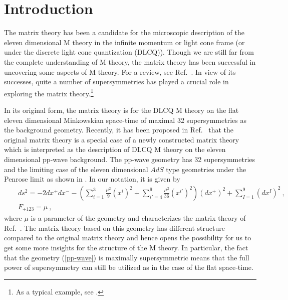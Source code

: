 \documentclass[a4paper,12pt]{article}
\begin{document}

\section{Introduction}

The matrix theory has been a candidate for the microscopic
description of the eleven dimensional M theory in the infinite
momentum \cite{ban043} or light cone frame
\cite{sus080,sei009,sen220} (or under the discrete light cone
quantization (DLCQ)).  Though we are still far from the complete
understanding of M theory, the matrix theory has been successful
in uncovering some aspects of M theory. For a review, see
Ref.~\cite{tay126}.  In view of its successes, quite a number of
supersymmetries has played a crucial role in exploring the matrix
theory.\footnote{As a typical example, see \cite{hyu022}.}

In its original form, the matrix theory is for the DLCQ M theory
on the flat eleven dimensional Minkowskian space-time of maximal
32 supersymmetries as the background geometry.  Recently, it has
been proposed in Ref.~\cite{ber021} that the original matrix
theory is a special case of a newly constructed matrix theory
which is interpreted as the description of DLCQ M theory on the
eleven dimensional pp-wave background.  The pp-wave geometry
\cite{kow194,guv061,fig308} has 32 supersymmetries and the
limiting case of the eleven dimensional $AdS$ type geometries
under the Penrose limit \cite{pen271} as shown in \cite{bla081}.
In our notation, it is given by
\begin{eqnarray}
& & ds^2 = - 2 dx^+ dx^-
    - \left( \sum^3_{i=1} \frac{\mu^2}{9} (x^i)^2
            +\sum^9_{i'=4} \frac{\mu^2}{36} (x^{i'})^2
      \right) (dx^+)^2
    + \sum^9_{I=1} (dx^I)^2~,
                                      \nonumber \\
& & F_{+123} = \mu~,
\label{pp-wave}
\end{eqnarray}
where $\mu$ is a parameter of the geometry and characterizes the
matrix theory of Ref.~\cite{ber021}.  The matrix theory based on
this geometry has different structure compared to the original
matrix theory and hence opens the possibility for us to get some
more insights for the structure of the M theory.  In particular,
the fact that the geometry (\ref{pp-wave}) is maximally
supersymmetric means that the full power of supersymmetry can
still be utilized as in the case of the flat space-time.
\end{document}
